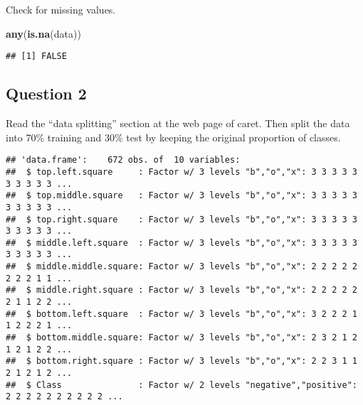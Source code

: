 \documentclass[]{article}
\newenvironment{Shaded}{\begin{snugshade}}{\end{snugshade}}
\newcommand{\DataTypeTok}[1]{\textcolor[rgb]{0.13,0.29,0.53}{#1}}
\newcommand{\DecValTok}[1]{\textcolor[rgb]{0.00,0.00,0.81}{#1}}
\newcommand{\KeywordTok}[1]{\textcolor[rgb]{0.13,0.29,0.53}{\textbf{#1}}}
\newcommand{\NormalTok}[1]{#1}
\newcommand{\OperatorTok}[1]{\textcolor[rgb]{0.81,0.36,0.00}{\textbf{#1}}}
\newcommand{\OtherTok}[1]{\textcolor[rgb]{0.56,0.35,0.01}{#1}}
\newcommand{\StringTok}[1]{\textcolor[rgb]{0.31,0.60,0.02}{#1}}
\begin{document}
Check for missing values.

\begin{Shaded}
\begin{Highlighting}[]
\KeywordTok{any}\NormalTok{(}\KeywordTok{is.na}\NormalTok{(data))}
\end{Highlighting}
\end{Shaded}

\begin{verbatim}
## [1] FALSE
\end{verbatim}

\hypertarget{question-2}{%
\subsection{Question 2}\label{question-2}}

Read the ``data splitting'' section at the web page of caret. Then split
the data into 70\% training and 30\% test by keeping the original
proportion of classes.

\begin{Shaded}
\end{Shaded}

\begin{verbatim}
## 'data.frame':    672 obs. of  10 variables:
##  $ top.left.square     : Factor w/ 3 levels "b","o","x": 3 3 3 3 3 3 3 3 3 3 ...
##  $ top.middle.square   : Factor w/ 3 levels "b","o","x": 3 3 3 3 3 3 3 3 3 3 ...
##  $ top.right.square    : Factor w/ 3 levels "b","o","x": 3 3 3 3 3 3 3 3 3 3 ...
##  $ middle.left.square  : Factor w/ 3 levels "b","o","x": 3 3 3 3 3 3 3 3 3 3 ...
##  $ middle.middle.square: Factor w/ 3 levels "b","o","x": 2 2 2 2 2 2 2 2 1 1 ...
##  $ middle.right.square : Factor w/ 3 levels "b","o","x": 2 2 2 2 2 2 1 1 2 2 ...
##  $ bottom.left.square  : Factor w/ 3 levels "b","o","x": 3 2 2 2 1 1 2 2 2 1 ...
##  $ bottom.middle.square: Factor w/ 3 levels "b","o","x": 2 3 2 1 2 1 2 1 2 2 ...
##  $ bottom.right.square : Factor w/ 3 levels "b","o","x": 2 2 3 1 1 2 1 2 1 2 ...
##  $ Class               : Factor w/ 2 levels "negative","positive": 2 2 2 2 2 2 2 2 2 2 ...
\end{verbatim}
\end{document}
